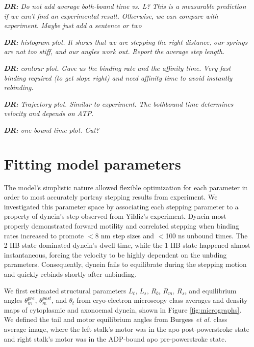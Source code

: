 \documentclass[9pt,twocolumn,twoside]{article}
\newcommand\davidsays[1]{{\em\color{blue} {\bf DR:} #1}}
\begin{document}
\davidsays{Do not add average both-bound time vs. L? This is a measurable prediction if we can't find an experimental result.  Otherwise, we can compare with experiment.  Maybe just add a sentence or two}

\davidsays{histogram plot.  It shows that we are stepping the right distance, our springs are not too stiff, and our angles work out.  Report the average step length.}

\davidsays{contour plot. Gave us the binding rate and the affinity time. Very fast binding required (to get slope right) and need affinity time to avoid instantly rebinding.}

\davidsays{Trajectory plot.  Similar to experiment. The bothbound time determines velocity and depends on ATP.}

\davidsays{one-bound time plot. Cut?}


\section*{Fitting model parameters}

The model's simplistic nature allowed flexible optimization for each parameter in order to most accurately portray stepping results from experiment. We investigated this parameter space by associating each stepping parameter to a property of dynein's step observed from Yildiz's experiment. Dynein most properly demonstrated forward motility and correlated stepping when binding rates increased to promote $<$8 nm step sizes and $<$100 ns unbound times. The 2-HB state dominated dynein's dwell time, while the 1-HB state happened almost instantaneous, forcing the velocity to be highly dependent on the unbding parameters. Consequently, dynein fails to equilibrate during the stepping motion and quickly rebinds shortly after unbinding. 

We first estimated structural parameters $L_t$, $L_s$, $R_b$, $R_m$, $R_s$, and equilibrium angles $\theta_{m}^{pre}$, $\theta_{m}^{post}$, and $\theta_{t}$ from cryo-electron microscopy class averages and density maps of cytoplasmic and axonoemal dynein, shown in Figure \ref{fig:micrographs}. We defined the tail and motor equilibrium angles from Burgess \textit{et al. } class average image, where the left stalk's motor was in the apo post-powerstroke state and right stalk's motor was in the ADP-bound apo pre-powerstroke state.  

\end{document}

